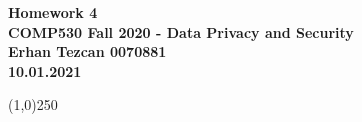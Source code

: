 \documentclass[12pt,reqno]{amsart}
\begin{document}
\begin{center}
\large\textbf{Homework 4 \\ COMP530 Fall 2020 - Data Privacy and Security \\}
\normalsize\textbf{ Erhan Tezcan 0070881 \\ 10.01.2021} \\
\end{center}

\begin{center}
\line(1,0){250}
\end{center}

%
%

\end{document}
